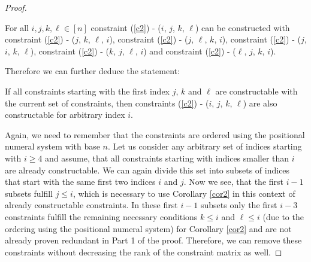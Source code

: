 \begin{proof}
\begin{corollary}\label{cor1}
	For all $i, j, k, \ell \in [n]$ constraint (\ref{c2}) - ($i$, $j$, $k$, $\ell$) can be constructed with constraint (\ref{c2}) - ($j$, $k$, $\ell$, $i$),  constraint (\ref{c2}) - ($j$, $\ell$, $k$, $i$), constraint (\ref{c2}) - ($j$, $i$, $k$, $\ell$), constraint (\ref{c2}) - ($k$, $j$, $\ell$, $i$) and constraint (\ref{c2}) - ($\ell$, $j$, $k$, $i$).
\end{corollary}

Therefore we can further deduce the statement: 

\begin{corollary}\label{cor2}
	If all constraints starting with the first index $j$, $k$ and $\ell$ are constructable with the current set of constraints, then constraints (\ref{c2}) - ($i$, $j$, $k$, $\ell$) are also constructable for arbitrary index $i$.
\end{corollary}

Again, we need to remember that the constraints are ordered using the positional numeral system with base $n$. Let us consider any arbitrary set of indices starting with $i \geq 4$ and assume, that all constraints starting with indices smaller than $i$ are already constructable. We can again divide this set into subsets of indices that start with the same first two indices $i$ and $j$. Now we see, that the first $i-1$ subsets fulfill $j \leq i$, which is necessary to use Corollary \ref{cor2} in this context of already constructable constraints. In these first $i-1$ subsets only the first $i-3$ constraints fulfill the remaining necessary conditions $k \leq i$ and $\ell \leq i$ (due to the ordering using the positional numeral system) for Corollary \ref{cor2} and are not already proven redundant in Part 1 of the proof. Therefore, we can remove these constraints without decreasing the rank of the constraint matrix as well.

\end{proof}

